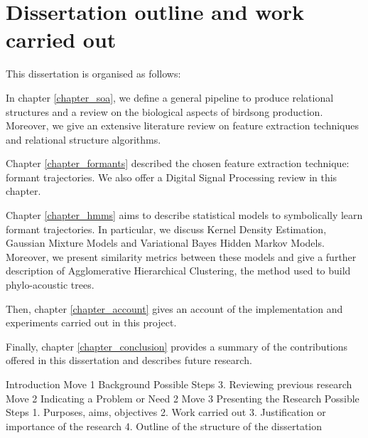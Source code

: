 \documentclass[../main.tex]{subfiles}
\begin{document}
\section{Dissertation outline and work carried out}
This dissertation is organised as follows:
\par In chapter \ref{chapter_soa}, we define a general pipeline to produce relational structures and a review on the biological aspects of birdsong production. Moreover, we give an extensive literature review on feature extraction techniques and relational structure algorithms.
\par Chapter \ref{chapter_formants} described the chosen feature extraction technique: formant trajectories. We also offer a Digital Signal Processing review in this chapter.
\par Chapter \ref{chapter_hmms} aims to describe statistical models to symbolically learn formant trajectories. In particular, we discuss Kernel Density Estimation, Gaussian Mixture Models and Variational Bayes Hidden Markov Models. Moreover, we present similarity metrics between these models and give a further description of Agglomerative Hierarchical Clustering, the method used to build phylo-acoustic trees.
\par Then, chapter \ref{chapter_account} gives an account of the implementation and experiments carried out in this project.
\par Finally, chapter \ref{chapter_conclusion} provides a summary of the contributions offered in this dissertation and describes future research.




Introduction
Move 1 Background
Possible Steps 
3. Reviewing previous research
Move 2 
Indicating a Problem or Need
2
Move 3 Presenting the Research
Possible Steps 1. Purposes, aims, objectives
2. Work carried out
3. Justification or importance of the research
4. Outline of the structure of the dissertation
\end{document}
